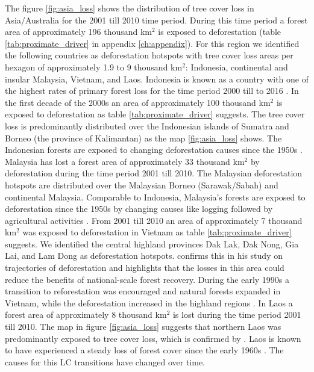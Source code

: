 			The figure \ref{fig:asia_loss} shows the distribution of tree cover loss in Asia/Australia for the 2001 till 2010 time period. During this time period a forest area of approximately 196 thousand km$^2$ is exposed to deforestation (table \ref{tab:proximate_driver} in appendix \ref{ch:appendix}). For this region we identified the following countries as deforestation hotspots with tree cover loss areas per hexagon of approximately 1.9 to 9 thousand km$^2$: Indonesia, continental and insular Malaysia, Vietnam, and Laos. Indonesia is known as a country with one of the highest rates of primary forest loss for the time period 2000 till to 2016 \citep{Austin2019}. In the first decade of the 2000s an area of approximately 100 thousand km$^2$ is exposed to deforestation as table \ref{tab:proximate_driver} suggests. The tree cover loss is predominantly distributed over the Indonesian islands of Sumatra and Borneo (the province of Kalimantan) as the map \ref{fig:asia_loss} shows. The Indonesian forests are exposed to changing deforestation causes since the 1950s \citep{Nawir2007}. Malaysia has lost a forest area of approximately 33 thousand km$^2$ by deforestation during the time period 2001 till 2010. The  Malaysian deforestation hotspots are distributed over the Malaysian Borneo (Sarawak/Sabah) and continental Malaysia. Comparable to Indonesia, Malaysia's forests are exposed to deforestation since the 1950s by changing causes like logging followed by agricultural activities \citep{Kummer1994}. From 2001 till 2010 an area of approximately 7 thousand km$^2$ was exposed to deforestation in Vietnam as table \ref{tab:proximate_driver} suggests. We identified the central highland provinces Dak Lak, Dak Nong, Gia Lai, and Lam Dong as deforestation hotspots. \citet{Meyfroidt2013} confirms this in his study on trajectories of deforestation and highlights that the losses in this area could reduce the benefits of national-scale forest recovery. During the early 1990s a transition to reforestation was encouraged and natural forests expanded in Vietnam, while the deforestation increased in the highland regions \citep{Meyfroidt2013,Chazdon2008}. In Laos a forest area of approximately 8 thousand km$^2$ is lost during the time period 2001 till 2010. The map in figure \ref{fig:asia_loss} suggests that northern Laos was predominantly exposed to tree cover loss, which is confirmed by \citet{Hirsch2000}. Laos is known to have experienced a steady loss of forest cover since the early 1960s \citep{Hirsch2000}. The causes for this \ac{LC} transitions have changed over time.
